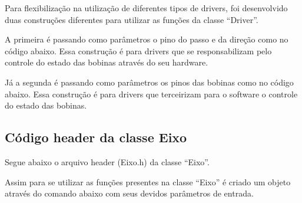 {{{{
{

Para flexibilização na utilização de diferentes tipos de drivers, foi desenvolvido 
duas construções diferentes para utilizar as funções da classe “Driver”.

A primeira é passando como parâmetros o pino do passo e da direção como no código abaixo.
Essa construção é para drivers que se responsabilizam pelo controle do estado 
das bobinas através do seu hardware.

{

Já a segunda é passando como parâmetros os pinos das bobinas como no código abaixo.
Essa construção é para drivers que terceirizam para o software o controle
do estado das bobinas.

{

\subsection{Código header da classe Eixo}\label{subsec:reseixo}

Segue abaixo o arquivo header (Eixo.h) da classe “Eixo”.

{

Assim para se utilizar as funções presentes na classe “Eixo” é criado um objeto 
através do comando abaixo com seus devidos parâmetros de entrada.

{

}}}}}}}}}
